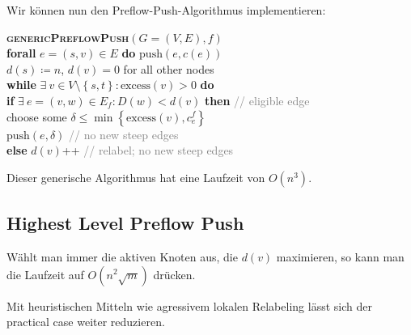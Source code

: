 Wir können nun den Preflow-Push-Algorithmus implementieren:

\begin{pseudocode}
  \textbf{\textsc{genericPreflowPush}}\( (G = (V, E), f) \) \\
  \phantom{\enskip} \textbf{forall} \( e = (s,v) \in E \) \textbf{do} \( \text{push}(e, c(e)) \) \\
  \phantom{\enskip} \( d(s) \coloneqq n \), \( d(v) = 0 \) for all other nodes \\
  \phantom{\enskip} \textbf{while} \( \exists \ v \in V \setminus \left \{ s, t \right \} : \text{excess}(v) > 0 \) \textbf{do} \\
  \phantom{\enskip} \phantom{\enskip} \textbf{if} \( \exists \ e = (v,w) \in E_f : D(w) < d(v) \) \textbf{then} \enskip \textcolor{gray}{// eligible edge} \\
  \phantom{\enskip} \phantom{\enskip} \phantom{\enskip} choose some \( \delta \leq \min \left \{ \text{excess}(v), c_e^f \right \} \) \\
  \phantom{\enskip} \phantom{\enskip} \phantom{\enskip} \( \text{push}(e,\delta) \) \enskip \textcolor{gray}{// no new steep edges} \\
  \phantom{\enskip} \phantom{\enskip} \textbf{else} \( d(v) \)++ \enskip \textcolor{gray}{// relabel; no new steep edges}
  \phantom{\enskip}
\end{pseudocode}

Dieser generische Algorithmus hat eine Laufzeit von \( O(n^3) \). 

\subsection{Highest Level Preflow Push}

Wählt man immer die aktiven Knoten aus, die \( d(v) \) maximieren, so kann man die Laufzeit auf \( O(n^2\sqrt{m}) \) drücken.

Mit heuristischen Mitteln wie agressivem lokalen Relabeling lässt sich der practical case weiter reduzieren.